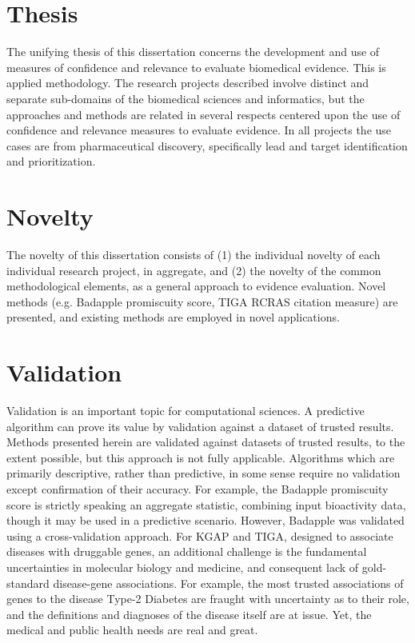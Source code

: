 \section{Thesis}

The unifying thesis of this dissertation concerns the development and use of measures of confidence and relevance to evaluate biomedical evidence. This is applied methodology. The research projects described involve distinct and separate sub-domains of the biomedical sciences and informatics, but the approaches and methods are related in several respects centered upon the use of confidence and relevance measures to evaluate evidence. In all projects the use cases are from pharmaceutical discovery, specifically lead and target identification and prioritization.  

\section{Novelty}

The novelty of this dissertation consists of (1) the individual novelty of each individual research project, in aggregate, and (2) the novelty of the common methodological elements, as a general approach to evidence evaluation. Novel methods (e.g. Badapple promiscuity score, TIGA RCRAS citation measure) are presented, and existing methods are employed in novel applications.

\section{Validation}

Validation is an important topic for computational sciences. A predictive algorithm can prove its value by validation against a dataset of trusted results. Methods presented herein are validated against datasets of trusted results, to the extent possible, but this approach is not fully applicable. Algorithms which are primarily descriptive, rather than predictive, in some sense require no validation except confirmation of their accuracy. For example, the Badapple promiscuity score is strictly speaking an aggregate statistic, combining input bioactivity data, though it may be used in a predictive scenario. However, Badapple was validated using a cross-validation approach. For KGAP and TIGA, designed to associate diseases with druggable genes, an additional challenge is the fundamental uncertainties in molecular biology and medicine, and consequent lack of gold-standard disease-gene associations. For example, the most trusted associations of genes to the disease Type-2 Diabetes are fraught with uncertainty as to their role, and the definitions and diagnoses of the disease itself are at issue. Yet, the medical and public health needs are real and great. 


